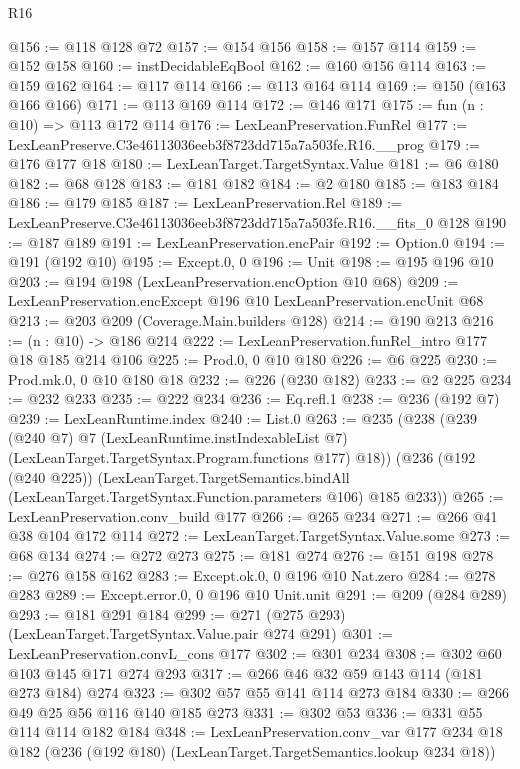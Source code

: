 \begin{lexlean}{R16}
\begin{coremodule}
@156 := @118 @128 @72
@157 := @154 @156
@158 := @157 @114
@159 := @152 @158
@160 := instDecidableEqBool
@162 := @160 @156 @114
@163 := @159 @162
@164 := @117 @114
@166 := @113 @164 @114
@169 := @150 (@163 @166 @166)
@171 := @113 @169 @114
@172 := @146 @171
@175 := fun (n : @10) => @113 @172 @114
@176 := LexLeanPreservation.FunRel
@177 := LexLeanPreserve.C3e46113036eeb3f8723dd715a7a503fe.R16.__prog
@179 := @176 @177 @18
@180 := LexLeanTarget.TargetSyntax.Value
@181 := @6 @180
@182 := @68 @128
@183 := @181 @182
@184 := @2 @180
@185 := @183 @184
@186 := @179 @185
@187 := LexLeanPreservation.Rel
@189 := LexLeanPreserve.C3e46113036eeb3f8723dd715a7a503fe.R16.__fits_0 @128
@190 := @187 @189
@191 := LexLeanPreservation.encPair
@192 := Option.{0}
@194 := @191 (@192 @10)
@195 := Except.{0, 0}
@196 := Unit
@198 := @195 @196 @10
@203 := @194 @198 (LexLeanPreservation.encOption @10 @68)
@209 := LexLeanPreservation.encExcept @196 @10 LexLeanPreservation.encUnit @68
@213 := @203 @209 (Coverage.Main.builders @128)
@214 := @190 @213
@216 := (n : @10) -> @186 @214
@222 := LexLeanPreservation.funRel_intro @177 @18 @185 @214 @106
@225 := Prod.{0, 0} @10 @180
@226 := @6 @225
@230 := Prod.mk.{0, 0} @10 @180 @18
@232 := @226 (@230 @182)
@233 := @2 @225
@234 := @232 @233
@235 := @222 @234
@236 := Eq.refl.{1}
@238 := @236 (@192 @7)
@239 := LexLeanRuntime.index
@240 := List.{0}
@263 := @235
    (@238
      (@239
        (@240 @7)
        @7
        (LexLeanRuntime.instIndexableList @7)
        (LexLeanTarget.TargetSyntax.Program.functions @177)
        @18))
    (@236
      (@192 (@240 @225))
      (LexLeanTarget.TargetSemantics.bindAll
        (LexLeanTarget.TargetSyntax.Function.parameters @106)
        @185
        @233))
@265 := LexLeanPreservation.conv_build @177
@266 := @265 @234
@271 := @266 @41 @38 @104 @172 @114
@272 := LexLeanTarget.TargetSyntax.Value.some
@273 := @68 @134
@274 := @272 @273
@275 := @181 @274
@276 := @151 @198
@278 := @276 @158 @162
@283 := Except.ok.{0, 0} @196 @10 Nat.zero
@284 := @278 @283
@289 := Except.error.{0, 0} @196 @10 Unit.unit
@291 := @209 (@284 @289)
@293 := @181 @291 @184
@299 := @271 (@275 @293) (LexLeanTarget.TargetSyntax.Value.pair @274 @291)
@301 := LexLeanPreservation.convL_cons @177
@302 := @301 @234
@308 := @302 @60 @103 @145 @171 @274 @293
@317 := @266 @46 @32 @59 @143 @114 (@181 @273 @184) @274
@323 := @302 @57 @55 @141 @114 @273 @184
@330 := @266 @49 @25 @56 @116 @140 @185 @273
@331 := @302 @53
@336 := @331 @55 @114 @114 @182 @184
@348 := LexLeanPreservation.conv_var
    @177
    @234
    @18
    @182
    (@236 (@192 @180) (LexLeanTarget.TargetSemantics.lookup @234 @18))

\end{coremodule}
\end{lexlean}
